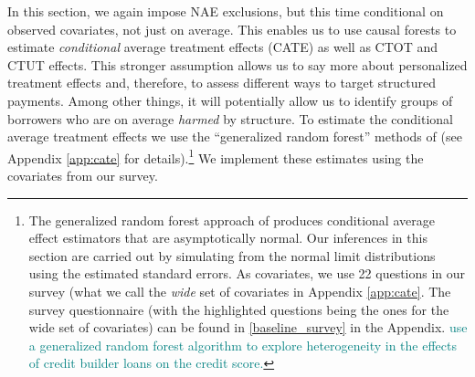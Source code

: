 \documentclass[12pt, a4paper, colorinlistoftodos]{article}
\begin{document}
In this section, we again impose NAE exclusions, but this time conditional on observed covariates, not just on average. This enables us to use causal forests to estimate \textit{conditional} average treatment effects (CATE) as well as CTOT and CTUT effects. This stronger assumption allows us to say more about personalized treatment effects and, therefore, to assess different ways to target structured payments.  %
Among other things, it will potentially allow us to identify groups of borrowers who are on average \emph{harmed} by structure.
To estimate the conditional average treatment effects we use the ``generalized random forest'' methods of \cite{atheygrf} (see Appendix \ref{app:cate} for details).\footnote{The generalized random forest approach of \cite{atheygrf} produces conditional average effect estimators that are asymptotically normal.
Our inferences in this section are carried out by simulating from the normal limit distributions using the estimated standard errors. As covariates, we use 22 questions in our survey (what we call the \textit{wide} set of covariates in Appendix \ref{app:cate}. The survey questionnaire (with the highlighted questions being the ones for the wide set of covariates) can be found in \ref{baseline_survey} in the Appendix. \textcolor{teal}{ \cite{burke2022credit} use a generalized random forest algorithm to explore heterogeneity in the effects of credit builder loans on the credit score.}}
We implement these estimates using the covariates from our survey.
\end{document}
